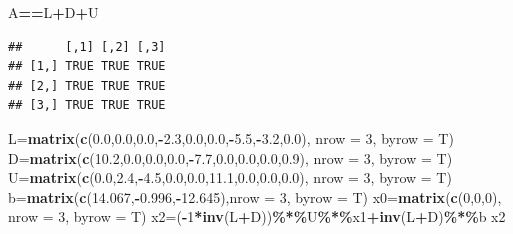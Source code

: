 \documentclass[
]{article}
\newenvironment{Shaded}{\begin{snugshade}}{\end{snugshade}}
\newcommand{\AttributeTok}[1]{\textcolor[rgb]{0.13,0.29,0.53}{#1}}
\newcommand{\DecValTok}[1]{\textcolor[rgb]{0.00,0.00,0.81}{#1}}
\newcommand{\FloatTok}[1]{\textcolor[rgb]{0.00,0.00,0.81}{#1}}
\newcommand{\FunctionTok}[1]{\textcolor[rgb]{0.13,0.29,0.53}{\textbf{#1}}}
\newcommand{\NormalTok}[1]{#1}
\newcommand{\OtherTok}[1]{\textcolor[rgb]{0.56,0.35,0.01}{#1}}
\newcommand{\SpecialCharTok}[1]{\textcolor[rgb]{0.81,0.36,0.00}{\textbf{#1}}}
\begin{document}
\begin{Shaded}
\begin{Highlighting}[]
\NormalTok{A}\SpecialCharTok{==}\NormalTok{L}\SpecialCharTok{+}\NormalTok{D}\SpecialCharTok{+}\NormalTok{U}
\end{Highlighting}
\end{Shaded}

\begin{verbatim}
##      [,1] [,2] [,3]
## [1,] TRUE TRUE TRUE
## [2,] TRUE TRUE TRUE
## [3,] TRUE TRUE TRUE
\end{verbatim}

\begin{Shaded}
\begin{Highlighting}[]
\NormalTok{  L}\OtherTok{=}\FunctionTok{matrix}\NormalTok{(}\FunctionTok{c}\NormalTok{(}\FloatTok{0.0}\NormalTok{,}\FloatTok{0.0}\NormalTok{,}\FloatTok{0.0}\NormalTok{,}\SpecialCharTok{{-}}\FloatTok{2.3}\NormalTok{,}\FloatTok{0.0}\NormalTok{,}\FloatTok{0.0}\NormalTok{,}\SpecialCharTok{{-}}\FloatTok{5.5}\NormalTok{,}\SpecialCharTok{{-}}\FloatTok{3.2}\NormalTok{,}\FloatTok{0.0}\NormalTok{), }\AttributeTok{nrow =} \DecValTok{3}\NormalTok{, }\AttributeTok{byrow =}\NormalTok{ T)}
\NormalTok{  D}\OtherTok{=}\FunctionTok{matrix}\NormalTok{(}\FunctionTok{c}\NormalTok{(}\FloatTok{10.2}\NormalTok{,}\FloatTok{0.0}\NormalTok{,}\FloatTok{0.0}\NormalTok{,}\FloatTok{0.0}\NormalTok{,}\SpecialCharTok{{-}}\FloatTok{7.7}\NormalTok{,}\FloatTok{0.0}\NormalTok{,}\FloatTok{0.0}\NormalTok{,}\FloatTok{0.0}\NormalTok{,}\FloatTok{0.9}\NormalTok{), }\AttributeTok{nrow =} \DecValTok{3}\NormalTok{, }\AttributeTok{byrow =}\NormalTok{ T)}
\NormalTok{  U}\OtherTok{=}\FunctionTok{matrix}\NormalTok{(}\FunctionTok{c}\NormalTok{(}\FloatTok{0.0}\NormalTok{,}\FloatTok{2.4}\NormalTok{,}\SpecialCharTok{{-}}\FloatTok{4.5}\NormalTok{,}\FloatTok{0.0}\NormalTok{,}\FloatTok{0.0}\NormalTok{,}\FloatTok{11.1}\NormalTok{,}\FloatTok{0.0}\NormalTok{,}\FloatTok{0.0}\NormalTok{,}\FloatTok{0.0}\NormalTok{), }\AttributeTok{nrow =} \DecValTok{3}\NormalTok{, }\AttributeTok{byrow =}\NormalTok{ T)}
\NormalTok{  b}\OtherTok{=}\FunctionTok{matrix}\NormalTok{(}\FunctionTok{c}\NormalTok{(}\FloatTok{14.067}\NormalTok{,}\SpecialCharTok{{-}}\FloatTok{0.996}\NormalTok{,}\SpecialCharTok{{-}}\FloatTok{12.645}\NormalTok{),}\AttributeTok{nrow =} \DecValTok{3}\NormalTok{, }\AttributeTok{byrow =}\NormalTok{ T)}
\NormalTok{  x0}\OtherTok{=}\FunctionTok{matrix}\NormalTok{(}\FunctionTok{c}\NormalTok{(}\DecValTok{0}\NormalTok{,}\DecValTok{0}\NormalTok{,}\DecValTok{0}\NormalTok{), }\AttributeTok{nrow =} \DecValTok{3}\NormalTok{, }\AttributeTok{byrow =}\NormalTok{ T)}
\NormalTok{ x2}\OtherTok{=}\NormalTok{(}\SpecialCharTok{{-}}\DecValTok{1}\SpecialCharTok{*}\FunctionTok{inv}\NormalTok{(L}\SpecialCharTok{+}\NormalTok{D))}\SpecialCharTok{\%*\%}\NormalTok{U}\SpecialCharTok{\%*\%}\NormalTok{x1}\SpecialCharTok{+}\FunctionTok{inv}\NormalTok{(L}\SpecialCharTok{+}\NormalTok{D)}\SpecialCharTok{\%*\%}\NormalTok{b}
\NormalTok{x2}
\end{Highlighting}
\end{Shaded}
\end{document}
